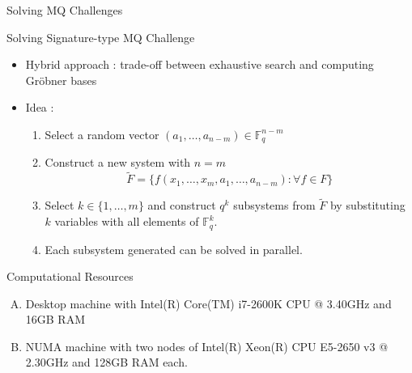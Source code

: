 \documentclass{beamer}
\newcommand{\Field}{\mathbb{F}}
\newcommand{\FField}[1]{\Field_{#1}}
\newcommand{\Grobner}{Gr\"{o}bner }
\begin{document}
\begin{section}{Solving MQ Challenges}
  \begin{frame}{Solving Signature-type MQ Challenge}
    \begin{itemize}
    \item Hybrid approach : trade-off between exhaustive search and
      computing \Grobner bases
    \item Idea :
      \begin{enumerate}
      \item Select a random vector
        $(a_1, \ldots, a_{n-m}) \in \FField{q}^{n-m}$
      \item Construct a new system with $n=m$
        $$
        \tilde{F} = \{ f(x_1, \ldots, x_m, a_1, \ldots, a_{n-m}) :
        \forall f \in F \}
        $$
      \item Select $k \in \{ 1, \ldots, m\}$ and construct $q^k$
        subsystems from $\tilde{F}$ by substituting $k$ variables with
        all elements of $\FField{q}^k$.
      \item Each subsystem generated can be solved in parallel.
      \end{enumerate}
    \end{itemize}
  \end{frame}

  \begin{frame}{Computational Resources}

    \begin{enumerate}[A)]
    \item<1-> Desktop machine with Intel(R) Core(TM) i7-2600K CPU @
      3.40GHz and 16GB RAM
    \item<2-> NUMA machine with two nodes of Intel(R) Xeon(R) CPU
      E5-2650 v3 @ 2.30GHz and 128GB RAM each.
    \end{enumerate}
  \end{frame}


\end{section}
\end{document}
